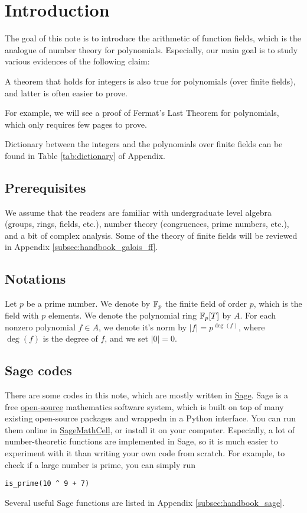 \section{Introduction}
\label{sec:intro}

The goal of this note is to introduce the arithmetic of function fields, which is the analogue of number theory for polynomials.
Especially, our main goal is to study various evidences of the following claim:

\begin{myquote}
A theorem that holds for integers is also true for polynomials (over finite fields), and latter is often easier to prove.
\end{myquote}
For example, we will see a proof of Fermat's Last Theorem for polynomials, which only requires few pages to prove.

Dictionary between the integers and the polynomials over finite fields can be found in Table \ref{tab:dictionary} of Appendix.

\subsection*{Prerequisites}
We assume that the readers are familiar with undergraduate level algebra (groups, rings, fields, etc.), number theory (congruences, prime numbers, etc.), and a bit of complex analysis.
Some of the theory of finite fields will be reviewed in Appendix \ref{subsec:handbook_galois_ff}.


\subsection*{Notations}

Let $p$ be a prime number. We denote by $\mathbb{F}_p$ the finite field of order $p$, which is the field with $p$ elements.
We denote the polynomial ring $\mathbb{F}_p[T]$ by $A$.
For each nonzero polynomial $f \in A$, we denote it's norm by $|f| = p^{\deg (f)}$, where $\deg (f)$ is the degree of $f$, and we set $|0| = 0$.

\subsection*{Sage codes}

There are some codes in this note, which are mostly written in \href{https://www.sagemath.org/}{Sage}.
Sage is a free \href{https://github.com/sagemath/sage}{open-source} mathematics software system, which is built on top of many existing open-source packages and wrappedn in a Python interface.
You can run them online in \href{https://sagecell.sagemath.org/}{SageMathCell}, or install it on your computer.
Especially, a lot of number-theoretic functions are implemented in Sage, so it is much easier to experiment with it than writing your own code from scratch.
For example, to check if a large number is prime, you can simply run
\begin{verbatim}
is_prime(10 ^ 9 + 7)
\end{verbatim}
Several useful Sage functions are listed in Appendix \ref{subsec:handbook_sage}.


